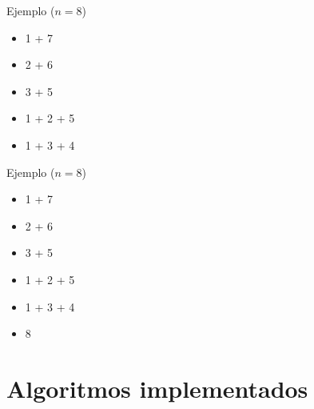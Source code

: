 \documentclass{beamer}
\begin{document}
\begin{frame}[fragile]{Ejemplo ($n=8$)}
\begin{itemize}
	\item 1 + 7
	\item 2 + 6
	\item 3 + 5
	\item 1 + 2 + 5
	\item 1 + 3 + 4
\end{itemize}
\end{frame}

\begin{frame}[fragile]{Ejemplo ($n=8$)}
\begin{itemize}
	\item 1 + 7
	\item 2 + 6
	\item 3 + 5
	\item 1 + 2 + 5
	\item 1 + 3 + 4
	\item 8	
\end{itemize}
\end{frame}

\section{Algoritmos implementados}
\end{document}

